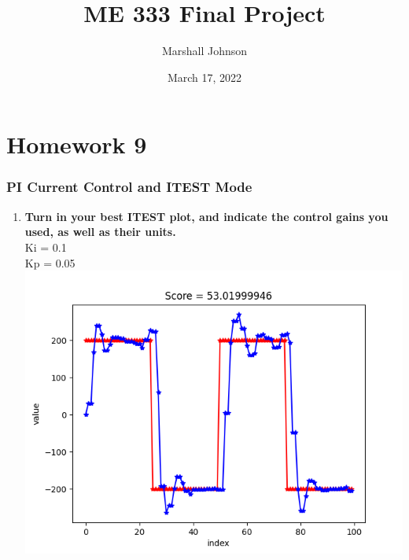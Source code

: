 \documentclass{article}
\title{ME 333 Final Project}
\author{Marshall Johnson}
\date{March 17, 2022}
\begin{document}
\maketitle

\section*{Homework 9}

\setcounter{section}{28}
\setcounter{subsection}{4}
\setcounter{subsubsection}{9}
\subsubsection{PI Current Control and ITEST Mode}
\begin{enumerate}[label=\textbf{\arabic*})]
    \item \textbf{Turn in your best ITEST plot, and indicate the control gains you used, as well as
    their units.} \\

        Ki = 0.1 \\
        Kp = 0.05 \\

        \includegraphics[width=\linewidth]{itest.png}
\end{enumerate}
\end{document}
